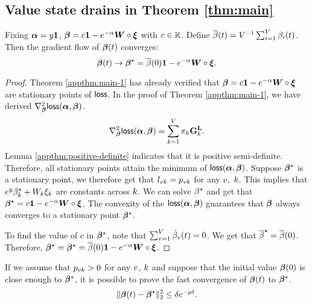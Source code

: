 \subsection{Value state drains in Theorem \ref{thm:main}}
\begin{theorem}\label{appthm:main-3}
Fixing $\bm{\alpha}=y\bm{1}$, $\boldsymbol{\beta}=c\bm{1}-e^{-\alpha} \bm{W}\circ \bm{\xi}$ with $c\in\mathbb{R}$. Define $\overline{\beta}(t)=V^{-1}\sum_{i=1}^V \beta_i(t)$. Then the gradient flow of $\boldsymbol{\beta}(t)$ converges:
\[
\boldsymbol{\beta}(t) \to \boldsymbol{\beta}^\star=\overline{\beta}(0)\bm{1}-e^{-\alpha} \bm{W}\circ \bm{\xi}.
\]
\end{theorem}
\begin{proof}
Theorem \ref{appthm:main-1} has already verified that $\boldsymbol{\beta}=c\bm{1}-e^{-\alpha} \bm{W}\circ \bm{\xi}$ are stationary points of $\mathsf{loss}$.
In the proof of Theorem \ref{appthm:main-1}, we have derived $\nabla^2_{\boldsymbol{\beta}} \mathsf{loss}(\bm{\alpha},\boldsymbol{\beta})$.
\begin{align*}
\nabla^2_{\boldsymbol{\beta}} \mathsf{loss}(\bm{\alpha},\boldsymbol{\beta}) = \sum_{k=1}^V \pi_k {\mathbf G}^{\mathbf{L}}_k.
\end{align*}
Lemma \ref{appthm:positive-definite} indicates that it is positive semi-definite. Therefore, all stationary points attain the minimum of $\mathsf{loss}(\bm{\alpha},\boldsymbol{\beta})$. Suppose $\boldsymbol{\beta}^\star$ is a stationary point, we therefore get that $l_{vk}=p_{vk}$ for any $v,$ $k$. This implies that $e^y \beta^\star_k + W_k \xi_k$ are constants across $k$. We can solve $\beta^\star$ and get that
$\boldsymbol{\beta}^\star=c\bm{1}-e^{-\alpha} \bm{W}\circ \bm{\xi}$. The convexity of the $\mathsf{loss}(\bm{\alpha},\boldsymbol{\beta})$ guarantees that $\boldsymbol{\beta}$ always converges to a stationary point $\boldsymbol{\beta}^\star$.

To find the value of $c$ in $\boldsymbol{\beta}^\star$, note that  $\sum_{v=1}^V \dot{\beta}_v(t)=0$. We get that $\overline{\beta}^\star=\overline{\beta}(0)$. Therefore, $\boldsymbol{\beta}^\star=\boldsymbol{\beta}^\star=\overline{\beta}(0)\bm{1}-e^{-\alpha} \bm{W}\circ \bm{\xi}$.
\end{proof}
\begin{remark}
If we assume that $p_{vk}>0$ for any $v$, $k$ and suppose that the initial value $\boldsymbol{\beta}(0)$ is close enough to $\boldsymbol{\beta}^\star$, it is possible to prove the fast convergence of $\boldsymbol{\beta}(t)$ to $\boldsymbol{\beta}^\star$.
\begin{equation*}
\|\boldsymbol{\beta}(t) - \boldsymbol{\beta}^\star\|^2_2 \leq \delta e^{-\mu t}.
\end{equation*}
\end{remark}


